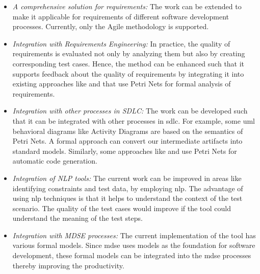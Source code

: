 \begin{itemize}
\item \textit{A comprehensive solution for requirements:} The work can be extended to make it applicable for requirements of different software development processes. Currently, only the Agile methodology is supported.
\item \textit{Integration with Requirements Engineering:} In practice, the quality of requirements is evaluated not only by analyzing them but also by creating corresponding test cases. Hence, the method can be enhanced such that it supports feedback about the quality of requirements by integrating it into existing approaches like \cite{some2007petri} and \cite{sarmiento2015analysis} that use Petri Nets for formal analysis of requirements. 
\item \textit{Integration with other processes in SDLC:} The work can be developed such that it can be integrated with other processes in \gls{sdlc}. For example, some \gls{uml} behavioral diagrams like Activity Diagrams are based on the semantics of Petri Nets. A formal approach can convert our intermediate artifacts into standard models. Similarly, some approaches like \cite{xu2011tool} and \cite{hagge2005new} use Petri Nets for automatic code generation.
\item \textit{Integration of NLP tools:} The current work can be improved in areas like identifying constraints and test data, by employing \gls{nlp}. The advantage of using \gls{nlp} techniques is that it helps to understand the context of the test scenario. The quality of the test cases would improve if the tool could understand the meaning of the test steps.
\item \textit{Integration with MDSE processes:} The current implementation of the tool has various formal models. Since \gls{mdse} uses models as the foundation for software development, these formal models can be integrated into the \gls{mdse} processes thereby improving the productivity.
\end{itemize} 

